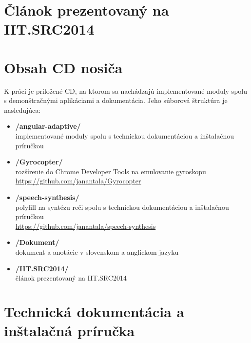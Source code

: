
\section{Článok prezentovaný na IIT.SRC2014} %
\label{sec:_l_nok_prezentovan_na_iit_src2014}


\newpage
\section{Obsah CD nosiča} %
\label{sec:obsah_cd_nosi_a}
K práci je priložené CD, na ktorom sa nachádzajú implementované moduly spolu s demonštračnými aplikáciami a dokumentácia. Jeho súborová štruktúra je nasledujúca:

\begin{itemize}
  \item \textbf{/angular-adaptive/}\\
    implementované moduly spolu s technickou dokumentáciou a inštalačnou príručkou

  \item \textbf{/Gyrocopter/}\\
    rozšírenie do Chrome Developer Tools na emulovanie gyroskopu\\
    \url{https://github.com/janantala/Gyrocopter}

  \item \textbf{/speech-synthesis/}\\
    polyfill na syntézu reči spolu s technickou dokumentáciou a inštalačnou príručkou\\
    \url{https://github.com/janantala/speech-synthesis}

  \item \textbf{/Dokument/}\\
    dokument a anotácie v slovenskom a anglickom jazyku

  \item \textbf{/IIT.SRC2014/}\\
    článok prezentovaný na IIT.SRC2014

\end{itemize}


\newpage
\section{Technická dokumentácia a inštalačná príručka} %
\label{sec:technick_dokument_cia_a_in_tala_n_pr_ru_ka}


